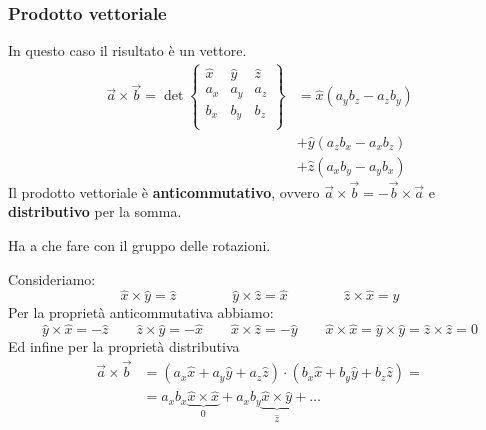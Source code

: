 \subsubsection{Prodotto vettoriale}
In questo caso il risultato è un vettore.
\begin{align*}
	\vec{a} \times \vec{b} = \det \begin{Bmatrix}
		\widehat{x} & \widehat{y} & \widehat{z} \\
		a_x & a_y & a_z \\
		b_x & b_y & b_z \\
	\end{Bmatrix} &=
	\widehat{x} (a_yb_z - a_zb_y) \\
	& + \widehat{y} (a_z b_x - a_xb_z) \\
	& + \widehat{z} (a_xb_y - a_y b_x)
\end{align*}
Il prodotto vettoriale è \textbf{anticommutativo}, ovvero $\vec{a} \times \vec{b} = -\vec{b} \times \vec{a}$ e \textbf{distributivo} per la somma.

\begin{note}
	Ha a che fare con il gruppo delle rotazioni.
\end{note}

\begin{definition}
	Consideriamo:
	\begin{equation*}
		\widehat{x} \times \widehat{y} = \widehat{z} \qquad\qquad \widehat{y} \times \widehat{z} = \widehat{x} \qquad\qquad \widehat{z} \times \widehat{x} = \widehat{y}
	\end{equation*}
	Per la proprietà anticommutativa abbiamo:
	\begin{equation*}
		\widehat{y} \times \widehat{x} = -\widehat{z} \qquad \widehat{z} \times \widehat{y} = -\widehat{x} \qquad \widehat{x} \times \widehat{z} = -\widehat{y} \qquad \widehat{x} \times \widehat{x} = \widehat{y} \times \widehat{y} = \widehat{z} \times \widehat{z} = 0
	\end{equation*}
	Ed infine per la proprietà distributiva
	\begin{align*}
		\vec{a} \times \vec{b} & = (a_x \widehat{x}+ a_y \widehat{y}+ a_z\widehat{z}) \cdot ( b_x \widehat{x} + b_y \widehat{y}+b_z \widehat{z})=\\
		& = a_xb_x\underbrace{\widehat{x} \times \widehat{x}}_0 + a_xb_y \underbrace{\widehat{x} \times \widehat{y}}_{\widehat{z}} + \ldots
	\end{align*}
\end{definition}

